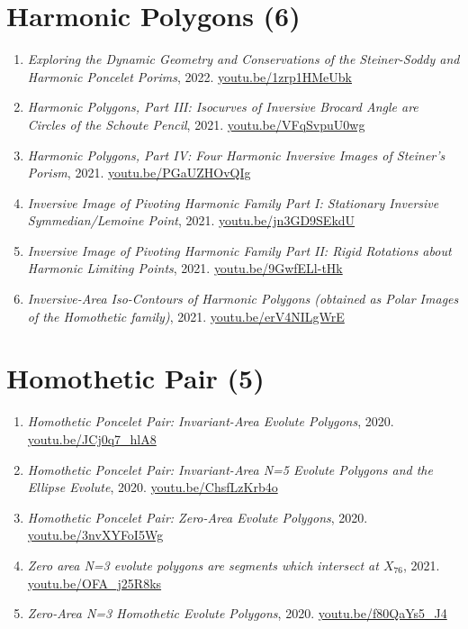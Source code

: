 \documentclass[12pt]{article}
\begin{document}
\section{Harmonic Polygons (6)}

\begin{enumerate}[resume]
\item \textit{Exploring the Dynamic Geometry and Conservations of the Steiner-Soddy and Harmonic Poncelet Porims}, 2022. \href{https://youtu.be/1zrp1HMeUbk}{\url{youtu.be/1zrp1HMeUbk}}
\item \textit{Harmonic Polygons, Part III: Isocurves of Inversive Brocard Angle are Circles of the Schoute Pencil}, 2021. \href{https://youtu.be/VFqSvpuU0wg}{\url{youtu.be/VFqSvpuU0wg}}
\item \textit{Harmonic Polygons, Part IV: Four Harmonic Inversive Images of Steiner's Porism}, 2021. \href{https://youtu.be/PGaUZHOvQIg}{\url{youtu.be/PGaUZHOvQIg}}
\item \textit{Inversive Image of Pivoting Harmonic Family Part I: Stationary Inversive Symmedian/Lemoine Point}, 2021. \href{https://youtu.be/jn3GD9SEkdU}{\url{youtu.be/jn3GD9SEkdU}}
\item \textit{Inversive Image of Pivoting Harmonic Family Part II: Rigid Rotations about Harmonic Limiting Points}, 2021. \href{https://youtu.be/9GwfELl-tHk}{\url{youtu.be/9GwfELl-tHk}}
\item \textit{Inversive-Area Iso-Contours of Harmonic Polygons (obtained as Polar Images of the Homothetic family)}, 2021. \href{https://youtu.be/erV4NILgWrE}{\url{youtu.be/erV4NILgWrE}}
\end{enumerate}

\section{Homothetic Pair (5)}

\begin{enumerate}[resume]
\item \textit{Homothetic Poncelet Pair: Invariant-Area Evolute Polygons}, 2020. \href{https://youtu.be/JCj0q7_hlA8}{\url{youtu.be/JCj0q7\_hlA8}}
\item \textit{Homothetic Poncelet Pair: Invariant-Area N=5 Evolute Polygons and the Ellipse Evolute}, 2020. \href{https://youtu.be/ChsfLzKrb4o}{\url{youtu.be/ChsfLzKrb4o}}
\item \textit{Homothetic Poncelet Pair: Zero-Area Evolute Polygons}, 2020. \href{https://youtu.be/3nvXYFoI5Wg}{\url{youtu.be/3nvXYFoI5Wg}}
\item \textit{Zero area N=3 evolute polygons are segments which intersect at $X_{76}$}, 2021. \href{https://youtu.be/OFA_j25R8ks}{\url{youtu.be/OFA\_j25R8ks}}
\item \textit{Zero-Area N=3 Homothetic Evolute Polygons}, 2020. \href{https://youtu.be/f80QaYs5_J4}{\url{youtu.be/f80QaYs5\_J4}}
\end{enumerate}
\end{document}
